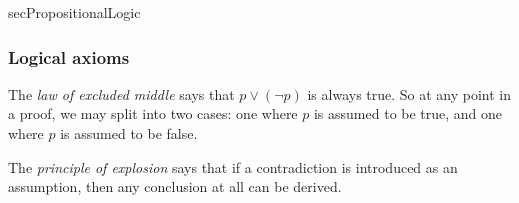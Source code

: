 \begin{tldr}{secPropositionalLogic}
\subsubsection*{Logical axioms}

\begin{tldrlist}
The \textit{law of excluded middle} says that $p \vee (\neg p)$ is always true. So at any point in a proof, we may split into two cases: one where $p$ is assumed to be true, and one where $p$ is assumed to be false.

The\textit{ principle of explosion} says that if a contradiction is introduced as an assumption, then any conclusion at all can be derived.
\end{tldrlist}
\end{tldr}
